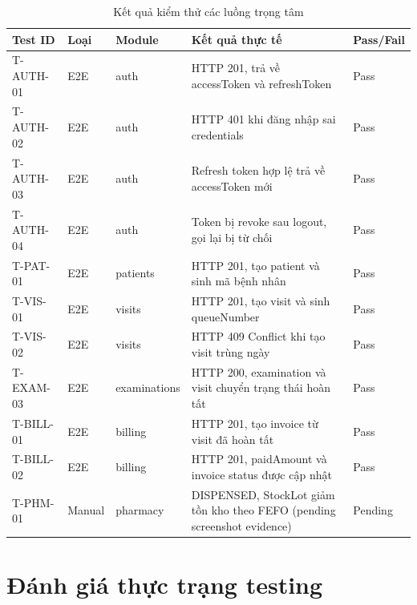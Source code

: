 \begin{longtable}{|p{2cm}|p{1.5cm}|p{2.5cm}|p{5.5cm}|p{2cm}|}
\caption{Kết quả kiểm thử các luồng trọng tâm}\\
\hline
\textbf{Test ID} & \textbf{Loại} & \textbf{Module} & \textbf{Kết quả thực tế} & \textbf{Pass/Fail} \\
\hline
T-AUTH-01 & E2E & auth & HTTP 201, trả về accessToken và refreshToken & Pass \\
\hline
T-AUTH-02 & E2E & auth & HTTP 401 khi đăng nhập sai credentials & Pass \\
\hline
T-AUTH-03 & E2E & auth & Refresh token hợp lệ trả về accessToken mới & Pass \\
\hline
T-AUTH-04 & E2E & auth & Token bị revoke sau logout, gọi lại bị từ chối & Pass \\
\hline
T-PAT-01 & E2E & patients & HTTP 201, tạo patient và sinh mã bệnh nhân & Pass \\
\hline
T-VIS-01 & E2E & visits & HTTP 201, tạo visit và sinh queueNumber & Pass \\
\hline
T-VIS-02 & E2E & visits & HTTP 409 Conflict khi tạo visit trùng ngày & Pass \\
\hline
T-EXAM-03 & E2E & examinations & HTTP 200, examination và visit chuyển trạng thái hoàn tất & Pass \\
\hline
T-BILL-01 & E2E & billing & HTTP 201, tạo invoice từ visit đã hoàn tất & Pass \\
\hline
T-BILL-02 & E2E & billing & HTTP 201, paidAmount và invoice status được cập nhật & Pass \\
\hline
T-PHM-01 & Manual & pharmacy & DISPENSED, StockLot giảm tồn kho theo FEFO (pending screenshot evidence) & Pending \\
\hline
\end{longtable}

\section{Đánh giá thực trạng testing}

